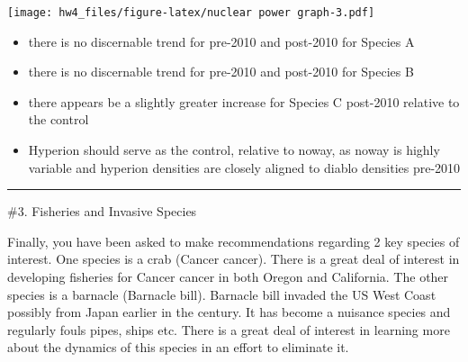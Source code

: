 \documentclass[]{article}
\newenvironment{Shaded}{\begin{snugshade}}{\end{snugshade}}
\newcommand{\CommentTok}[1]{\textcolor[rgb]{0.56,0.35,0.01}{\textit{#1}}}
\newcommand{\DataTypeTok}[1]{\textcolor[rgb]{0.13,0.29,0.53}{#1}}
\newcommand{\DecValTok}[1]{\textcolor[rgb]{0.00,0.00,0.81}{#1}}
\newcommand{\FloatTok}[1]{\textcolor[rgb]{0.00,0.00,0.81}{#1}}
\newcommand{\KeywordTok}[1]{\textcolor[rgb]{0.13,0.29,0.53}{\textbf{#1}}}
\newcommand{\NormalTok}[1]{#1}
\newcommand{\OperatorTok}[1]{\textcolor[rgb]{0.81,0.36,0.00}{\textbf{#1}}}
\newcommand{\OtherTok}[1]{\textcolor[rgb]{0.56,0.35,0.01}{#1}}
\newcommand{\StringTok}[1]{\textcolor[rgb]{0.31,0.60,0.02}{#1}}
\begin{document}
\begin{Shaded}
\end{Shaded}

\texttt{[image: hw4\_files/figure-latex/nuclear power graph-3.pdf]}

\begin{itemize}
\item
  there is no discernable trend for pre-2010 and post-2010 for Species A
\item
  there is no discernable trend for pre-2010 and post-2010 for Species B
\item
  there appears be a slightly greater increase for Species C post-2010
  relative to the control
\item
  Hyperion should serve as the control, relative to noway, as noway is
  highly variable and hyperion densities are closely aligned to diablo
  densities pre-2010
\end{itemize}

\begin{center}\rule{0.5\linewidth}{\linethickness}\end{center}

\#3. Fisheries and Invasive Species

Finally, you have been asked to make recommendations regarding 2 key
species of interest. One species is a crab (Cancer cancer). There is a
great deal of interest in developing fisheries for Cancer cancer in both
Oregon and California. The other species is a barnacle (Barnacle bill).
Barnacle bill invaded the US West Coast possibly from Japan earlier in
the century. It has become a nuisance species and regularly fouls pipes,
ships etc. There is a great deal of interest in learning more about the
dynamics of this species in an effort to eliminate it.
\end{document}
